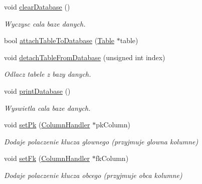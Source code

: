 \begin{DoxyCompactItemize}
\mbox{\label{class_database_a289b0374a783122e3fc62017b1a4f2d2}} 
void \mbox{\hyperlink{class_database_a289b0374a783122e3fc62017b1a4f2d2}{clear\+Database}} ()
\begin{DoxyCompactList}\small\item\em Wyczysc cala baze danych. \end{DoxyCompactList}\item 
bool \mbox{\hyperlink{class_database_ac0427d3cb0807610d5b5d2c2e910d95c}{attach\+Table\+To\+Database}} (\mbox{\hyperlink{class_table}{Table}} $\ast$table)
\item 
\mbox{\label{class_database_affa35fc28233e8c1bcce587cd0bfcf1a}} 
void \mbox{\hyperlink{class_database_affa35fc28233e8c1bcce587cd0bfcf1a}{detach\+Table\+From\+Database}} (unsigned int index)
\begin{DoxyCompactList}\small\item\em Odlacz tabele z bazy danych. \end{DoxyCompactList}\item 
\mbox{\label{class_database_a1b96ea42ef05966cbefddc0f58f62309}} 
void \mbox{\hyperlink{class_database_a1b96ea42ef05966cbefddc0f58f62309}{print\+Database}} ()
\begin{DoxyCompactList}\small\item\em Wyswietla cala baze danych. \end{DoxyCompactList}\item 
\mbox{\label{class_database_a5c807d796ad3dd3b1bec1022f6716384}} 
void \mbox{\hyperlink{class_database_a5c807d796ad3dd3b1bec1022f6716384}{set\+Pk}} (\mbox{\hyperlink{class_column_handler}{Column\+Handler}} $\ast$pk\+Column)
\begin{DoxyCompactList}\small\item\em Dodaje polaczenie klucza glownego (przyjmuje glowna kolumne) \end{DoxyCompactList}\item 
\mbox{\label{class_database_a2829a5d8fae11a7321a77bba69e0af94}} 
void \mbox{\hyperlink{class_database_a2829a5d8fae11a7321a77bba69e0af94}{set\+Fk}} (\mbox{\hyperlink{class_column_handler}{Column\+Handler}} $\ast$fk\+Column)
\begin{DoxyCompactList}\small\item\em Dodaje polaczenie klucza obcego (przyjmuje obca kolumne) \end{DoxyCompactList}\item 

\end{DoxyCompactItemize}
